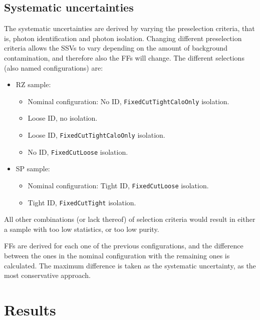 \subsection{Systematic uncertainties}

The systematic uncertainties are derived by varying the preselection criteria, that is, photon identification and photon isolation. 
Changing different preselection criteria allows the \acp{SSV} to vary depending on the amount of background contamination, and therefore also the \acp{FF} will change. 
The different selections (also named configurations) are:
\begin{itemize}
    \item \acf{RZ} sample:
        \begin{itemize}
            \item Nominal configuration: No ID, \texttt{FixedCutTightCaloOnly} isolation.
            \item Loose ID, no isolation.
            \item Loose ID, \texttt{FixedCutTightCaloOnly} isolation.
            \item No ID, \texttt{FixedCutLoose} isolation.
        \end{itemize}
    \item \acf{SP} sample:
        \begin{itemize}
            \item Nominal configuration: Tight ID, \texttt{FixedCutLoose} isolation.
            \item Tight ID, \texttt{FixedCutTight} isolation.
        \end{itemize}
\end{itemize}
All other combinations (or lack thereof) of selection criteria would result in either a sample with too low statistics, or too low purity.

\acp{FF} are derived for each one of the previous configurations, and the difference between the ones in the nominal configuration with the remaining ones is calculated. The maximum difference is taken as the systematic uncertainty, as the most conservative approach.












\section{Results}

